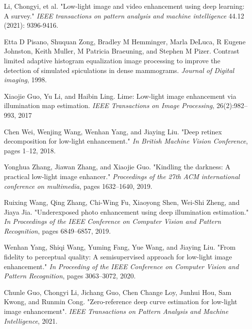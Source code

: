 
Li, Chongyi, et al. "Low-light image and video enhancement using deep learning: A survey." \textit{IEEE transactions on pattern analysis and machine intelligence} 44.12 (2021): 9396-9416.

%

Etta D Pisano, Shuquan Zong, Bradley M Hemminger, Marla DeLuca, R Eugene Johnston, Keith Muller, M Patricia Braeuning, and Stephen M Pizer. Contrast limited adaptive histogram equalization image processing to improve the detection of simulated spiculations in dense mammograms. \textit{Journal of Digital imaging}, 1998.

Xiaojie Guo, Yu Li, and Haibin Ling. Lime: Low-light image enhancement via illumination map estimation. \textit{IEEE Transactions on Image Processing}, 26(2):982–993, 2017 %

Chen Wei, Wenjing Wang, Wenhan Yang, and Jiaying Liu. "Deep retinex decomposition for low-light enhancement." \textit{In British Machine Vision Conference}, pages 1–12, 2018. %

Yonghua Zhang, Jiawan Zhang, and Xiaojie Guo. "Kindling the darkness: A practical low-light image enhancer." \textit{Proceedings of the 27th ACM international conference on multimedia}, pages 1632–1640, 2019. %

 Ruixing Wang, Qing Zhang, Chi-Wing Fu, Xiaoyong Shen, Wei-Shi Zheng, and Jiaya Jia. "Underexposed photo enhancement using deep illumination estimation." \textit{In Proceedings of the IEEE Conference on Computer Vision and Pattern Recognition}, pages 6849–6857, 2019. %

Wenhan Yang, Shiqi Wang, Yuming Fang, Yue Wang, and Jiaying Liu. "From fidelity to perceptual quality: A semisupervised approach for low-light image enhancement." \textit{In Proceeding of the IEEE Conference on Computer Vision and Pattern Recognition}, pages 3063–3072, 2020.  %

Chunle Guo, Chongyi Li, Jichang Guo, Chen Change Loy, Junhui Hou, Sam Kwong, and Runmin Cong. "Zero-reference deep curve estimation for low-light image enhancement". \textit{IEEE Transactions on Pattern Analysis and Machine Intelligence}, 2021. %

